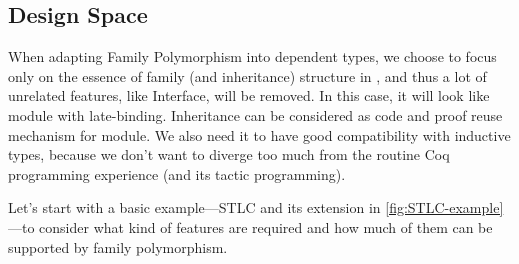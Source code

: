 \subsection{Design Space}

When adapting Family Polymorphism into dependent types, we choose to
focus only on the essence of family (and inheritance)
structure in \citet{zm2017}, and thus a lot of unrelated features, like
Interface, will be removed. In this case, it will look like module with
late-binding. Inheritance can be considered as code and proof reuse mechanism for module. We also
need it to have good compatibility with inductive types, because we
don't want to diverge too much from the routine Coq programming experience
(and its tactic programming). 

Let's start with a basic example---STLC and its extension in
\cref{fig:STLC-example}---to consider what kind of features are required
and how much of them can be supported by family polymorphism.

